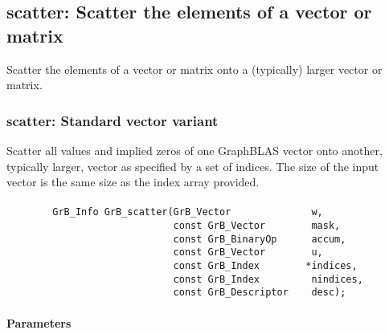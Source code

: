 \subsection{{\sf scatter}: Scatter the elements of a vector or matrix}
\label{Sec:scatter}

Scatter the elements of a vector or matrix onto a (typically) larger
vector or matrix.

\subsubsection{{\sf scatter}: Standard vector variant}

Scatter all values and implied zeros of one GraphBLAS vector onto another,
typically larger,
vector as specified by a set of indices. The size of the input vector is the
same size as the index array provided.

\paragraph{\syntax}

\begin{verbatim}
        GrB_Info GrB_scatter(GrB_Vector              w,
                             const GrB_Vector        mask,
                             const GrB_BinaryOp      accum,
                             const GrB_Vector        u,
                             const GrB_Index        *indices,
                             const GrB_Index         nindices,
                             const GrB_Descriptor    desc);
\end{verbatim}

\paragraph{Parameters}

